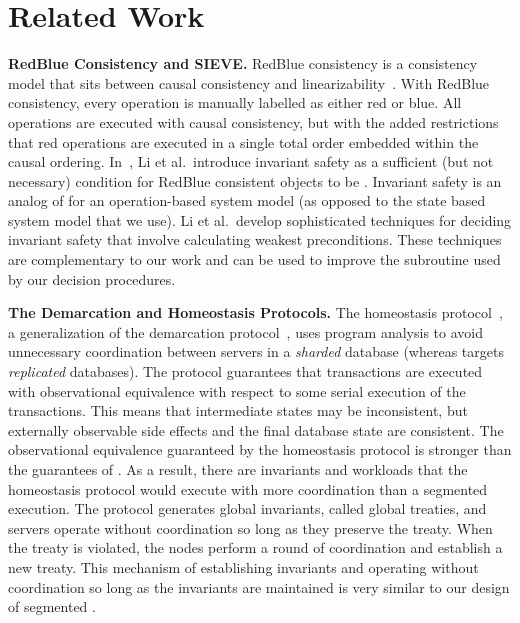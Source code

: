 \section{Related Work}

\newcommand{\sieve}{\textsc{SIEVE}}
\textbf{RedBlue Consistency and \sieve.}
RedBlue consistency is a consistency model that sits between causal consistency
and linearizability~\cite{li2012making}.
%
With RedBlue consistency, every operation is manually labelled as either red or
blue. All operations are executed with causal consistency, but with the added
restrictions that red operations are executed in a single total order embedded
within the causal ordering.
%
In~\cite{li2012making}, Li et al.\ introduce invariant safety as a
sufficient (but not necessary) condition for RedBlue consistent objects to be
\invariantconfluent{}. Invariant safety is an analog of \invariantclosure{} for
an operation-based system model (as opposed to the state based system model
that we use). Li et al.\ develop sophisticated techniques for deciding
invariant safety that involve calculating weakest preconditions. These
techniques are complementary to our work and can be used to improve the
\invariantclosure{} subroutine used by our decision procedures.

\textbf{The Demarcation and Homeostasis Protocols.}
The homeostasis protocol~\cite{roy2015homeostasis}, a generalization of the
demarcation protocol~\cite{barbara1994demarcation}, uses program analysis to
avoid unnecessary coordination between servers in a \emph{sharded} database
(whereas \invariantconfluence{} targets \emph{replicated} databases).  The
protocol guarantees that transactions are executed with observational
equivalence with respect to some serial execution of the transactions. This
means that intermediate states may be inconsistent, but externally observable
side effects and the final database state are consistent.  The observational
equivalence guaranteed by the homeostasis protocol is stronger than the
guarantees of \invariantconfluence{}. As a result, there are invariants and
workloads that the homeostasis protocol would execute with more coordination
than a segmented \invariantconfluent{} execution.  The protocol generates
global invariants, called global treaties, and servers operate without
coordination so long as they preserve the treaty. When the treaty is violated,
the nodes perform a round of coordination and establish a new treaty.  This
mechanism of establishing invariants and operating without coordination so long
as the invariants are maintained is very similar to our design of segmented
\invariantconfluence{}.

